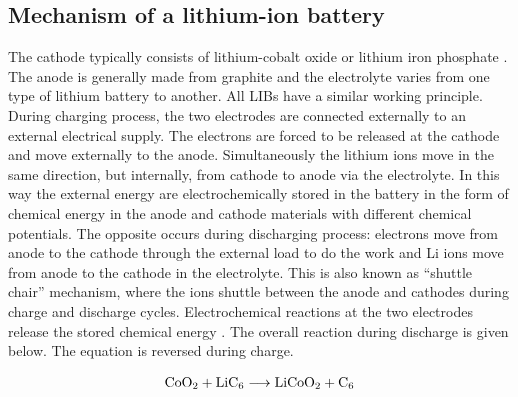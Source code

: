 \subsection*{Mechanism of a lithium-ion battery}
The cathode typically consists of lithium-cobalt oxide  or lithium iron phosphate . The anode is generally made from graphite and the electrolyte varies from one type of lithium battery to another. All LIBs have a similar working principle. During charging process, the two electrodes are connected externally to an external electrical supply. The electrons are forced to be released at the cathode and move externally to the anode. Simultaneously the lithium ions move in the same direction, but internally, from cathode to anode via the electrolyte. In this way the external energy are electrochemically stored in the battery in the form of chemical energy in the anode and cathode materials with different chemical potentials. The opposite occurs during discharging process: electrons move from anode to the cathode through the external load to do the work and Li ions move from anode to the cathode in the electrolyte. This is also known as \enquote{shuttle chair} mechanism, where the  ions shuttle between the anode and cathodes during charge and discharge cycles. Electrochemical reactions at the two electrodes release the stored chemical energy \cite{deng_li-ion_2015}. The overall reaction during discharge is given below. The equation is reversed during charge. 

\begin{align}
    \ce{CoO2} + \ce{LiC6} \longrightarrow \ce{LiCoO2} + \ce{C6}
\end{align}

\vspace{3mm}

